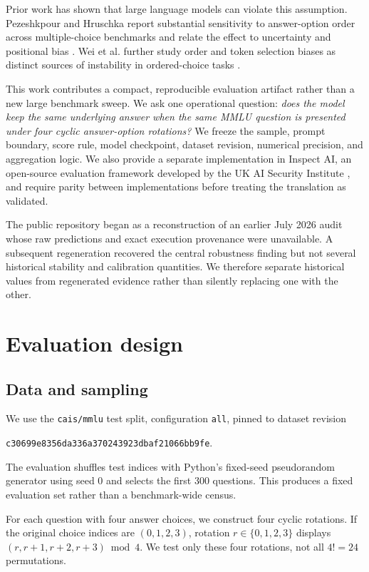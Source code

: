 \documentclass[10pt]{article}
\begin{document}
Prior work has shown that large language models can violate this assumption. Pezeshkpour and Hruschka report substantial sensitivity to answer-option order across multiple-choice benchmarks and relate the effect to uncertainty and positional bias \cite{pezeshkpour2023order}. Wei et al. further study order and token selection biases as distinct sources of instability in ordered-choice tasks \cite{wei2024selection}.

This work contributes a compact, reproducible evaluation artifact rather than a new large benchmark sweep. We ask one operational question: \emph{does the model keep the same underlying answer when the same MMLU question is presented under four cyclic answer-option rotations?} We freeze the sample, prompt boundary, score rule, model checkpoint, dataset revision, numerical precision, and aggregation logic. We also provide a separate implementation in Inspect AI, an open-source evaluation framework developed by the UK AI Security Institute \cite{inspect2024}, and require parity between implementations before treating the translation as validated.

The public repository began as a reconstruction of an earlier July 2026 audit whose raw predictions and exact execution provenance were unavailable. A subsequent regeneration recovered the central robustness finding but not several historical stability and calibration quantities. We therefore separate historical values from regenerated evidence rather than silently replacing one with the other.

\section{Evaluation design}

\subsection{Data and sampling}

We use the \texttt{cais/mmlu} test split, configuration \texttt{all}, pinned to dataset revision
\begin{center}
\small\texttt{c30699e8356da336a370243923dbaf21066bb9fe}.
\end{center}
The evaluation shuffles test indices with Python's fixed-seed pseudorandom generator using seed 0 and selects the first 300 questions. This produces a fixed evaluation set rather than a benchmark-wide census.

For each question with four answer choices, we construct four cyclic rotations. If the original choice indices are $(0,1,2,3)$, rotation $r\in\{0,1,2,3\}$ displays $(r,r+1,r+2,r+3)\bmod 4$. We test only these four rotations, not all $4!=24$ permutations.
\end{document}
